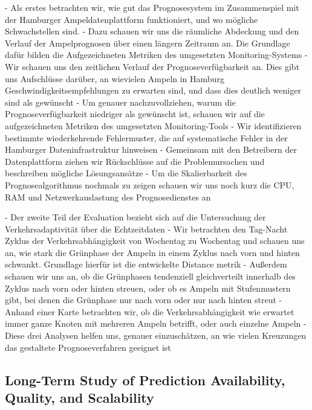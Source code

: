 - Als erstes betrachten wir, wie gut das Prognosesystem im Zusammenspiel mit der Hamburger Ampeldatenplattform funktioniert, und wo mögliche Schwachstellen sind.
- Dazu schauen wir uns die räumliche Abdeckung und den Verlauf der Ampelprognosen über einen längern Zeitraum an. Die Grundlage dafür bilden die Aufgezeichneten Metriken des umgesetzten Monitoring-Systems
- Wir schauen uns den zeitlichen Verlauf der Prognoseverfügbarkeit an. Dies gibt uns Aufschlüsse darüber, an wievielen Ampeln in Hamburg Geschwindigkeitsempfehlungen zu erwarten sind, und dass dies deutlich weniger sind als gewünscht
- Um genauer nachzuvollziehen, warum die Prognoseverfügbarkeit niedriger als gewünscht ist, schauen wir auf die aufgezeichneten Metriken des umgesetzten Monitoring-Tools
- Wir identifizieren bestimmte wiederkehrende Fehlermuster, die auf systematische Fehler in der Hamburger Dateninfrastruktur hinweisen
- Gemeinsam mit den Betreibern der Datenplattform ziehen wir Rückschlüsse auf die Problemursachen und beschreiben mögliche Lösungsansätze
- Um die Skalierbarkeit des Prognosealgorithmus nochmals zu zeigen schauen wir uns noch kurz die CPU, RAM und Netzwerkauslastung des Prognosedienstes an

- Der zweite Teil der Evaluation bezieht sich auf die Untersuchung der Verkehrsadaptivität über die Echtzeitdaten
- Wir betrachten den Tag-Nacht Zyklus der Verkehrsabhängigkeit von Wochentag zu Wochentag und schauen uns an, wie stark die Grünphase der Ampeln in einem Zyklus nach vorn und hinten schwankt. Grundlage hierfür ist die entwickelte Distance metrik
- Außerdem schauen wir uns an, ob die Grünphasen tendenziell gleichverteilt innerhalb des Zyklus nach vorn oder hinten streuen, oder ob es Ampeln mit Stufenmustern gibt, bei denen die Grünphase nur nach vorn oder nur nach hinten streut
- Anhand einer Karte betrachten wir, ob die Verkehrsabhängigkeit wie erwartet immer ganze Knoten mit mehreren Ampeln betrifft, oder auch einzelne Ampeln
- Diese drei Analysen helfen uns, genauer einzuschätzen, an wie vielen Kreuzungen das gestaltete Prognoseverfahren geeignet ist

\subsection{Long-Term Study of Prediction Availability, Quality, and Scalability}

